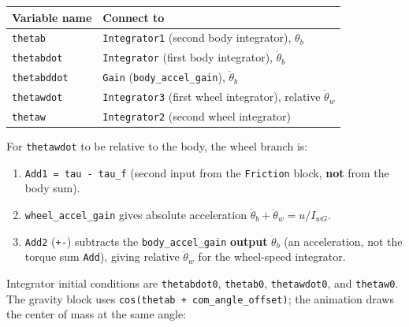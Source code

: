 \documentclass[
]{article}
\newcounter{none} %
\providecommand{\tightlist}{%
  \setlength{\itemsep}{0pt}\setlength{\parskip}{0pt}}
\begin{document}
{\def\LTcaptype{none} %
\begin{longtable}[]{@{}
  >{\raggedright\arraybackslash}p{}
  >{\raggedright\arraybackslash}p{}@{}}
\toprule\noalign{}
\begin{minipage}[b]{\linewidth}\raggedright
Variable name
\end{minipage} & \begin{minipage}[b]{\linewidth}\raggedright
Connect to
\end{minipage} \\
\midrule\noalign{}
\endhead
\bottomrule\noalign{}
\endlastfoot
\texttt{thetab} & \texttt{Integrator1} (second body integrator),
\(\theta_b\) \\
\texttt{thetabdot} & \texttt{Integrator} (first body integrator),
\(\dot\theta_b\) \\
\texttt{thetabddot} & \texttt{Gain} (\texttt{body\_accel\_gain}),
\(\ddot\theta_b\) \\
\texttt{thetawdot} & \texttt{Integrator3} (first wheel integrator),
relative \(\dot\theta_w\) \\
\texttt{thetaw} & \texttt{Integrator2} (second wheel integrator) \\
\end{longtable}
}

For \texttt{thetawdot} to be relative to the body, the wheel branch is:

\begin{enumerate}
\def\labelenumi{\arabic{enumi}.}
\tightlist
\item
  \texttt{Add1\ =\ tau\ -\ tau\_f} (second input from the
  \texttt{Friction} block, \textbf{not} from the body sum).
\item
  \texttt{wheel\_accel\_gain} gives absolute acceleration
  \(\ddot\theta_b+\ddot\theta_w=u/I_{wG}\).
\item
  \texttt{Add2} (\texttt{+-}) subtracts the \texttt{body\_accel\_gain}
  \textbf{output} \(\ddot\theta_b\) (an acceleration, not the torque sum
  \texttt{Add}), giving relative \(\ddot\theta_w\) for the wheel-speed
  integrator.
\end{enumerate}

Integrator initial conditions are \texttt{thetabdot0}, \texttt{thetab0},
\texttt{thetawdot0}, and \texttt{thetaw0}. The gravity block uses
\texttt{cos(thetab\ +\ com\_angle\_offset)}; the animation draws the
center of mass at the same angle:
\end{document}
